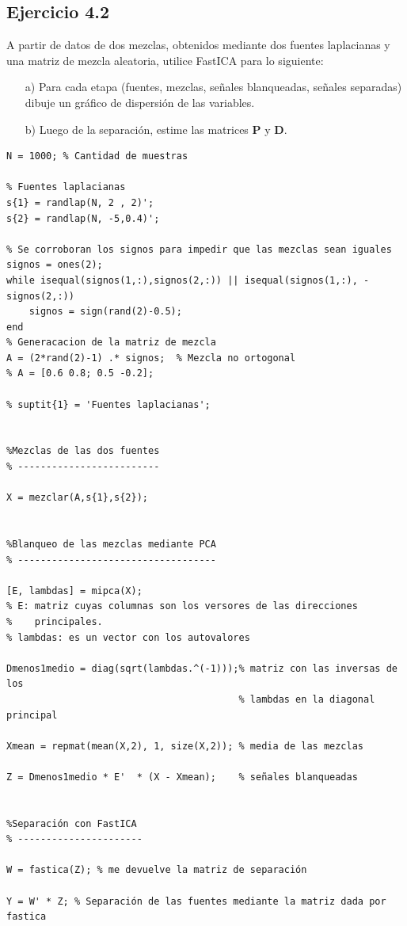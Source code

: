 \documentclass[11pt,a4paper,final]{article}
\begin{document}
\subsection{Ejercicio 4.2}

A partir de datos de dos mezclas, obtenidos mediante dos fuentes laplacianas y una matriz de mezcla aleatoria, utilice FastICA para lo siguiente:

\begin{enumerate}
   \item[a)] Para cada etapa (fuentes, mezclas, señales blanqueadas, señales   separadas) dibuje un gráfico de dispersión de las variables.
   \item[b)] Luego de la separación, estime las matrices $\mathbf{P}$ y $\mathbf{D}$.
\end{enumerate}
\begin{verbatim}
N = 1000; % Cantidad de muestras

% Fuentes laplacianas
s{1} = randlap(N, 2 , 2)';
s{2} = randlap(N, -5,0.4)';

% Se corroboran los signos para impedir que las mezclas sean iguales
signos = ones(2);
while isequal(signos(1,:),signos(2,:)) || isequal(signos(1,:), -signos(2,:))
    signos = sign(rand(2)-0.5);
end
% Generacacion de la matriz de mezcla
A = (2*rand(2)-1) .* signos;  % Mezcla no ortogonal
% A = [0.6 0.8; 0.5 -0.2];

% suptit{1} = 'Fuentes laplacianas';


%Mezclas de las dos fuentes
% -------------------------

X = mezclar(A,s{1},s{2});


%Blanqueo de las mezclas mediante PCA
% -----------------------------------

[E, lambdas] = mipca(X);
% E: matriz cuyas columnas son los versores de las direcciones
%    principales.
% lambdas: es un vector con los autovalores

Dmenos1medio = diag(sqrt(lambdas.^(-1)));% matriz con las inversas de los
                                         % lambdas en la diagonal principal

Xmean = repmat(mean(X,2), 1, size(X,2)); % media de las mezclas

Z = Dmenos1medio * E'  * (X - Xmean);    % señales blanqueadas


%Separación con FastICA
% ----------------------

W = fastica(Z); % me devuelve la matriz de separación

Y = W' * Z; % Separación de las fuentes mediante la matriz dada por fastica
\end{verbatim}
\end{document}

